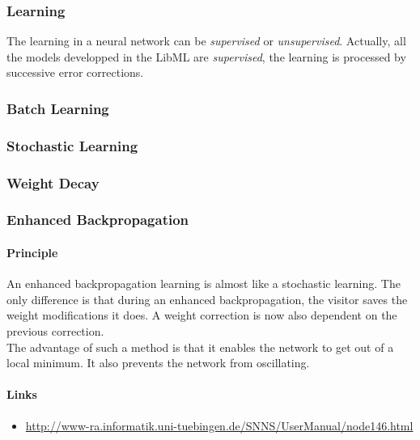 \subsubsection{Learning}

The learning in a neural network can be \emph{supervised} or \emph{unsupervised}. Actually, all the
models developped in the LibML are \emph{supervised}, the learning is processed by successive error 
corrections.

\subsubsection{Batch Learning}

\subsubsection{Stochastic Learning}

\subsubsection{Weight Decay}

\subsubsection{Enhanced Backpropagation}
\label{nn:enhancedbackprop}

\paragraph{Principle}
An enhanced backpropagation learning is almost like a stochastic learning.
The only difference is that during an enhanced backpropagation, the visitor
saves the weight modifications it does. A weight correction is now also
dependent on the previous correction.\\

The advantage of such a method is that it enables the network to get out of a
local minimum. It also prevents the network from oscillating.

\paragraph{Links}
\begin{itemize}
\item \url{http://www-ra.informatik.uni-tuebingen.de/SNNS/UserManual/node146.html}
\end{itemize}

